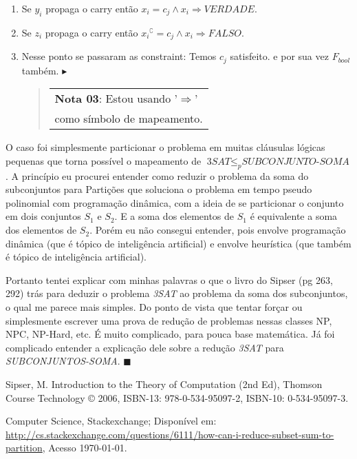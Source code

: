 \documentclass[12pt, a4paper]{article}
\begin{document}
\begin{enumerate}
\item Se $y_i$ propaga o carry então $x_i = c_j  \wedge x_i \Rightarrow \textit{VERDADE}$.

\item Se $z_i$ propaga o carry então ${x_i}^\complement = c_j \wedge x_i \Rightarrow \textit{FALSO}$.

\item Nesse ponto se passaram as constraint: Temos $c_j$ satisfeito. e por sua vez $F_{bool}$ também. $\blacktriangleright$

\begin{quote}
  \flushright
    \begin{tabular}{|l}
\textbf{Nota 03}: Estou usando '$\Rightarrow$' \\ como símbolo de mapeamento.
  \end{tabular}
\end{quote}

\end{enumerate}

O caso foi simplesmente particionar o problema em muitas cláusulas lógicas pequenas que torna possível o mapeamento de $\textit{3SAT} \leqslant_{p} \textit{SUBCONJUNTO-SOMA}$. A princípio eu procurei entender como reduzir o problema da soma do subconjuntos para Partições que soluciona o problema em tempo pseudo polinomial com programação dinâmica, com a ideia de se particionar o conjunto em dois conjuntos $S_1$ e $S_2$. E a soma dos elementos de $S_1$ é equivalente a soma dos elementos de $S_2$. Porém eu não consegui entender, pois envolve programação dinâmica (que é tópico de inteligência artificial) e envolve heurística (que também é tópico de inteligência artificial).

Portanto tentei explicar com minhas palavras o que o livro do Sipser (pg 263, 292) trás para deduzir o problema \textit{3SAT} ao problema da soma dos subconjuntos, o qual me parece mais simples. Do ponto de vista que tentar forçar ou simplesmente escrever uma prova de redução de problemas nessas classes NP, NPC, NP-Hard, etc. É muito complicado, para pouca base matemática. Já foi complicado entender a explicação dele sobre a redução \textit{3SAT} para \textit{SUBCONJUNTOS-SOMA}. $\blacksquare$

\pagebreak
\begin{thebibliography}{9}

 Sipser, M. Introduction to the Theory of Computation (2nd Ed), Thomson Course Technology © 2006, ISBN-13: 978-0-534-95097-2, ISBN-10: 0-534-95097-3.

 Computer Science, Stackexchange; Disponível em: \href{http://cs.stackexchange.com/questions/6111/how-can-i-reduce-subset-sum-to-partition}{http://cs.stackexchange.com/questions/6111/how-can-i-reduce-subset-sum-to-partition}, Acesso \today.


\end{thebibliography}
\end{document}

